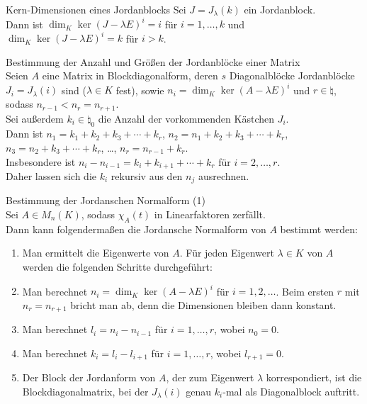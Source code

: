 \begin{Lemma}{Kern-Dimensionen eines Jordanblocks}
    Sei $J = J_\lambda(k)$ ein Jordanblock. \\
    Dann ist $\dim_K \ker(J - \lambda E)^i = i$ für $i = 1, \dotsc, k$ und
    $\dim_K \ker(J - \lambda E)^i = k$ für $i > k$.
\end{Lemma}

\begin{Lemma}{Bestimmung der Anzahl und
              Größen der Jordanblöcke einer Matrix} \\
    Seien $A$ eine Matrix in Blockdiagonalform, deren $s$ Diagonalblöcke
    Jordanblöcke $J_i = J_\lambda(i)$ sind ($\lambda \in K$ fest),
    sowie $n_i = \dim_K \ker(A - \lambda E)^i$ und $r \in \natural$,
    sodass $n_{r - 1} < n_r = n_{r+1}$. \\
    Sei außerdem $k_i \in \natural_0$ die Anzahl der vorkommenden Kästchen
    $J_i$. \\
    Dann ist $n_1 = k_1 + k_2 + k_3 + \dotsb + k_r$, \qquad
    $n_2 = n_1 + k_2 + k_3 + \dotsb + k_r$, \\
    $n_3 = n_2 + k_3 + \dotsb + k_r$, \quad \dots, \quad
    $n_r = n_{r-1} + k_r$. \\
    Insbesondere ist $n_i - n_{i-1} = k_i + k_{i+1} + \dotsb + k_r$ für
    $i = 2, \dotsc, r$. \\
    Daher lassen sich die $k_i$ rekursiv aus den $n_j$ ausrechnen.
\end{Lemma}

\begin{Prozedur}{Bestimmung der Jordanschen Normalform (1)} \\
    Sei $A \in M_n(K)$, sodass $\chi_A(t)$ in Linearfaktoren zerfällt. \\
    Dann kann folgendermaßen die Jordansche Normalform von $A$ bestimmt werden:
    \begin{enumerate}
        \item Man ermittelt die Eigenwerte von $A$.
        Für jeden Eigenwert $\lambda \in K$ von $A$ werden die folgenden
        Schritte durchgeführt:
        
        \item Man berechnet $n_i = \dim_K \ker(A - \lambda E)^i$ für
        $i = 1, 2, \dotsc$.
        Beim ersten $r$ mit $n_r = n_{r+1}$ bricht man ab, denn
        die Dimensionen bleiben dann konstant.
        
        \item Man berechnet $l_i = n_i - n_{i-1}$ für $i = 1, \dotsc, r$,
        wobei $n_0 = 0$.
        
        \item Man berechnet $k_i = l_i - l_{i+1}$ für $i = 1, \dotsc, r$,
        wobei $l_{r+1} = 0$.
        
        \item Der Block der Jordanform von $A$, der zum Eigenwert $\lambda$
        korrespondiert, ist die Blockdiagonalmatrix, bei der
        $J_\lambda(i)$ genau $k_i$-mal als Diagonalblock auftritt.
    \end{enumerate}
\end{Prozedur}

